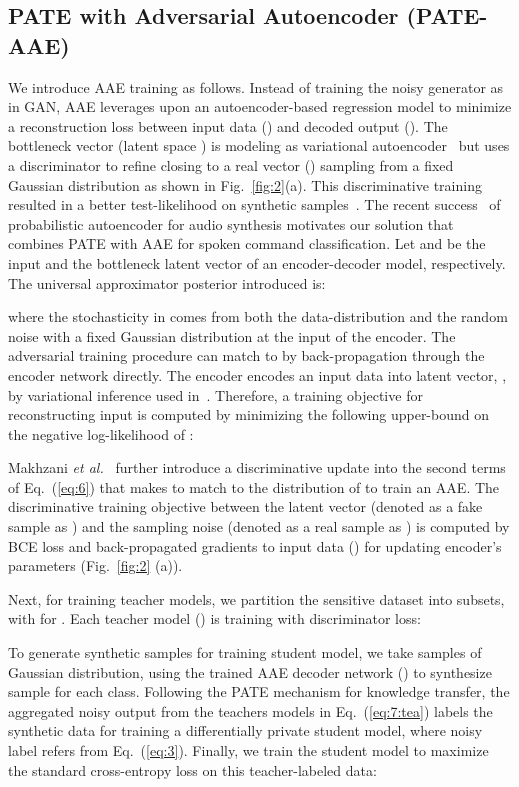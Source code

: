 \documentclass[a4paper]{article}
\begin{document}
\subsection{PATE with Adversarial Autoencoder (PATE-AAE)}
We introduce AAE training as follows. Instead of training the noisy generator as in GAN, AAE leverages upon an autoencoder-based regression model to minimize a reconstruction loss between input data () and decoded output (). The bottleneck vector (latent space ) is modeling as variational autoencoder~\cite{kingma2013auto} but uses a discriminator to refine  closing to a real vector () sampling from a fixed Gaussian distribution as shown in Fig.~\ref{fig:2}(a). This discriminative training resulted in a better test-likelihood on synthetic samples~\cite{makhzani2015adversarial}. The recent success~\cite{chorowski2019unsupervised} of probabilistic autoencoder for audio synthesis motivates our solution that combines PATE with AAE for spoken command classification. Let  and  be the input and the bottleneck latent vector of an encoder-decoder model, respectively. The universal approximator posterior  introduced \cite{makhzani2015adversarial} is:

where the stochasticity in  comes from both the data-distribution  and the random noise  with a fixed Gaussian distribution at the input of the encoder. The adversarial training procedure can match  to  by back-propagation through the encoder network directly. The encoder encodes an input data  into latent vector, , by variational inference used in~\cite{kingma2013auto}. Therefore, a training objective for reconstructing input  is computed by minimizing the following upper-bound on the negative log-likelihood of :


Makhzani \emph{et al.}~\cite{makhzani2015adversarial} further introduce a discriminative update into the second terms of Eq.~(\ref{eq:6}) that makes  to match to the distribution of  to train an AAE. The discriminative training objective between the latent vector  (denoted as a fake sample as ) and the sampling noise  (denoted as a real sample as ) is computed by BCE loss and back-propagated gradients to input data () for updating encoder's parameters (Fig.~\ref{fig:2} (a)).


Next, for training teacher models, we partition the sensitive dataset into  subsets,  with  for . Each teacher model () is training with discriminator loss:

To generate synthetic samples for training student model, we take  samples of Gaussian distribution,  using the trained AAE decoder network () to synthesize sample 
for each class. Following the PATE mechanism for knowledge transfer, the aggregated noisy output from the teachers models in Eq.~(\ref{eq:7:tea}) labels the synthetic data for training a differentially private student model, where noisy label refers  from Eq.~(\ref{eq:3}). Finally, we train the student model to maximize the standard cross-entropy loss on this teacher-labeled data:
\end{document}
